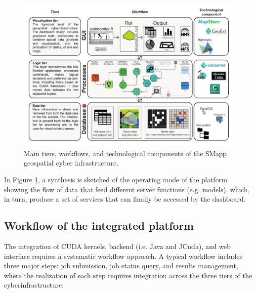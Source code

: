 \documentclass[APA,LATO1COL,doublespace]{WileyNJD-v2}
\begin{document}
\begin{figure}[t]
    \centerline{\includegraphics[width=500pt]{Figure02.pdf}}
    \caption{Main tiers, workflows, and technological components of the SMapp geospatial cyber infrastructure.} \label{fig:GCI}
\end{figure}

In Figure \ref{fig:GCI}, a synthesis is sketched of the operating mode of the platform showing the flow of data that feed different server functions (e.g. models), which, in turn, produce a set of services that can finally be accessed by the dashboard.

\subsection{Workflow of the integrated platform}
The integration of CUDA kernels, backend (i.e. Java and JCuda), and web interface requires a systematic workflow approach. 
A typical workflow includes three major steps: job submission, job status query, and results management, where the realization of each step requires integration across the three tiers of the cyberinfrastructure. 
\end{document}
